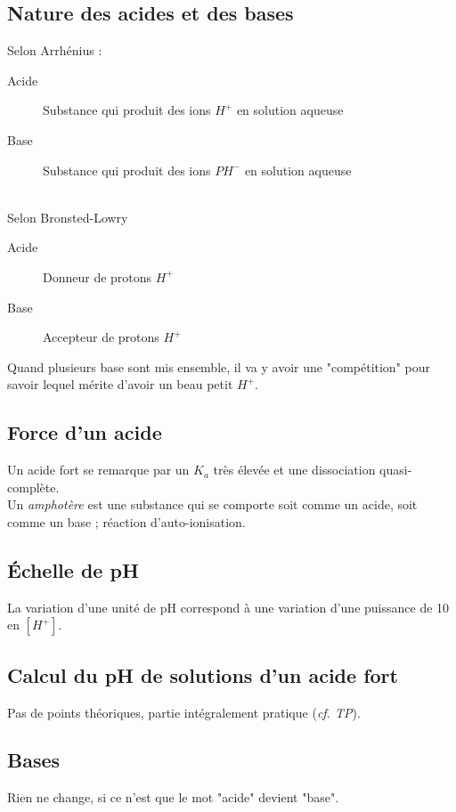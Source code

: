 \documentclass[12pt, a4paper]{article}
\begin{document}
\subsection{Nature des acides et des bases}
Selon Arrhénius : 
\begin{description}
\item[Acide] Substance qui produit des ions $H^+$ en solution aqueuse
\item[Base] Substance qui produit des ions $PH^-$ en solution aqueuse
\end{description}
\ \\

Selon Bronsted-Lowry 
\begin{description}
\item[Acide] Donneur de protons $H^+$
\item[Base] Accepteur de protons $H^+$
\end{description}

Quand plusieurs base sont mis ensemble, il va y avoir une "compétition" pour savoir lequel mérite d'avoir un beau petit $H^+$.

\subsection{Force d'un acide}
Un acide fort se remarque par un $K_a$ très élevée et une dissociation quasi-complète.\\

Un \textit{amphotère} est une substance qui se comporte soit comme un acide, soit comme un base ; réaction d'auto-ionisation.

\subsection{Échelle de pH}
La variation d'une unité de pH correspond à une variation d'une puissance de 10 en $[H^+]$.

\subsection{Calcul du pH de solutions d'un acide fort}
Pas de points théoriques, partie intégralement pratique (\textit{cf. TP}).

\subsection{Bases}
Rien ne change, si ce n'est que le mot "acide" devient "base".
\end{document}
